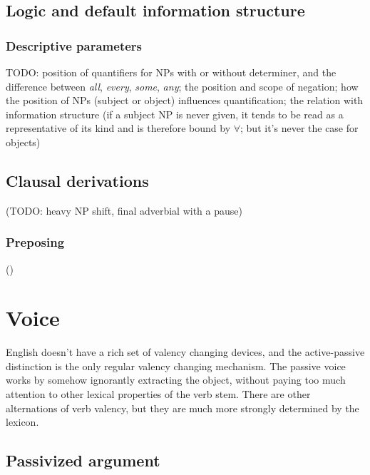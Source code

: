 \documentclass[UTF8, a4paper, oneside, scheme=plain, 12pt]{ctexbook}
\newcommand{\form}[1]{\emph{#1}}
\begin{document}
\subsection{Logic and default information structure}

\subsubsection{Descriptive parameters}

TODO: position of quantifiers for NPs with or without determiner,
and the difference between \form{all}, \form{every}, \form{some}, \form{any};
the position and scope of negation;
how the position of NPs (subject or object) influences quantification;
the relation with information structure
(if a subject NP is never given, 
it tends to be read as a representative of its kind and is therefore bound by $\forall$;
but it's never the case for objects)

\subsection{Clausal derivations}\label{sec:simple-clause.derivation}

(TODO: heavy NP shift, final adverbial with a pause)

\subsubsection{Preposing}\label{sec:simple-clause.derivation.preposing}

()


\section{Voice}\label{sec:simple-clause.voice}

English doesn't have a rich set of valency changing devices,
and the active-passive distinction is the only regular valency changing mechanism.
The passive voice works by somehow ignorantly extracting the object,
without paying too much attention to other lexical properties of the verb stem.
There are other alternations of verb valency,
but they are much more strongly determined by the lexicon. 

\subsection{Passivized argument}
\end{document}

